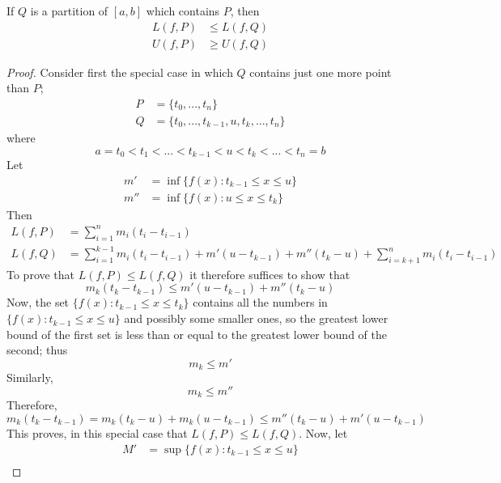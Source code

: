 \documentclass[12pt, a4paper, oneside, openright, titlepage]{book}
\begin{document}
\begin{lem}
    If $Q$ is a partition of $[a,b]$ which contains $P$, then \begin{align*}
        L(f,P) &\leq L(f,Q) \\
        U(f,P) &\geq U(f,Q)
    \end{align*}
\end{lem}
\begin{proof}
    Consider first the special case in which $Q$ contains just one more point than $P$;\begin{align*}
        P &=\{t_0,...,t_n\} \\
        Q &= \{t_0,...,t_{k-1},u,t_k,...,t_n\}
    \end{align*}
    where $$a= t_0 < t_1 < ... < t_{k-1} < u < t_k < ... < t_n = b$$
    Let \begin{align*}
        m' &= \inf\{f(x):t_{k-1}\leq x \leq u\} \\
        m'' &= \inf\{f(x):u \leq x \leq t_k\}
    \end{align*}
    Then \begin{align*}
        L(f,P) &= \sum\limits_{i=1}^nm_i(t_i - t_{i-1}) \\
        L(f,Q) &= \sum\limits_{i=1}^{k-1}m_i(t_i - t_{i-1}) + m'(u-t_{k-1}) + m''(t_k-u) + \sum\limits_{i=k+1}^nm_i(t_i - t_{i-1})
    \end{align*}
    To prove that $L(f,P) \leq L(f,Q)$ it therefore suffices to show that \begin{equation*}
        m_k(t_k-t_{k-1}) \leq m'(u-t_{k-1}) + m''(t_k-u)
    \end{equation*}
    Now, the set $\{f(x):t_{k-1}\leq x \leq t_k\}$ contains all the numbers in $\{f(x):t_{k-1}\leq x \leq u\}$ and possibly some smaller        ones, so the greatest lower bound of the first set is less than or equal to the greatest lower bound of the second; thus                    \begin{equation*}
        m_k \leq m'
    \end{equation*}
    Similarly, \begin{equation*}
        m_k \leq m''
    \end{equation*}
    Therefore, \begin{equation*}
        m_k(t_k-t_{k-1}) = m_k(t_k-u)+m_k(u-t_{k-1}) \leq m''(t_k-u)+m'(u-t_{k-1})
    \end{equation*}
    This proves, in this special case that $L(f,P) \leq L(f,Q)$. Now, let \begin{align*}
        M' &= \sup\{f(x):t_{k-1} \leq x \leq u\} \\

\end{align*}
\end{proof}
\end{document}
